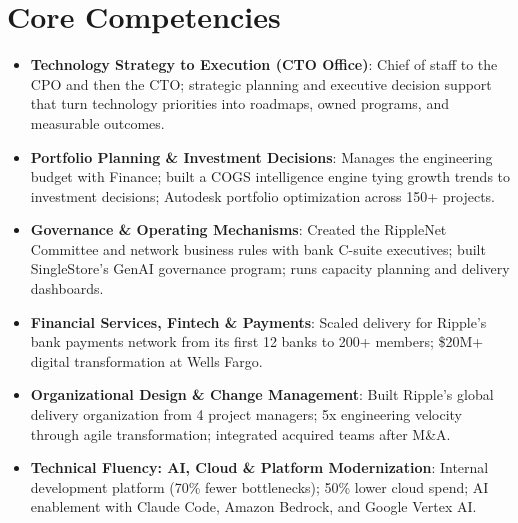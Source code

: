 \documentclass[11pt,letterpaper,sans]{moderncv}
\begin{document}
\section{Core Competencies}
\vspace{1pt}
\begin{itemize}

\item \textbf{Technology Strategy to Execution (CTO Office)}: Chief of staff to the CPO and then the CTO; strategic planning and executive decision support that turn technology priorities into roadmaps, owned programs, and measurable outcomes.

\item \textbf{Portfolio Planning \& Investment Decisions}: Manages the engineering budget with Finance; built a COGS intelligence engine tying growth trends to investment decisions; Autodesk portfolio optimization across 150+ projects.

\item \textbf{Governance \& Operating Mechanisms}: Created the RippleNet Committee and network business rules with bank C-suite executives; built SingleStore's GenAI governance program; runs capacity planning and delivery dashboards.

\item \textbf{Financial Services, Fintech \& Payments}: Scaled delivery for Ripple's bank payments network from its first 12 banks to 200+ members; \$20M+ digital transformation at Wells Fargo.

\item \textbf{Organizational Design \& Change Management}: Built Ripple's global delivery organization from 4 project managers; 5x engineering velocity through agile transformation; integrated acquired teams after M\&A.

\item \textbf{Technical Fluency: AI, Cloud \& Platform Modernization}: Internal development platform (70\% fewer bottlenecks); 50\% lower cloud spend; AI enablement with Claude Code, Amazon Bedrock, and Google Vertex AI.

\end{itemize}

\end{document}
